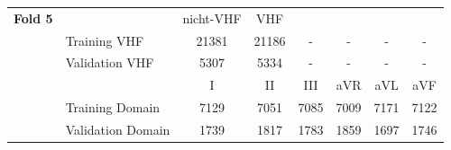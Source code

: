\begin{table}[h!]
\begin{tabular}{llcccccc}
\textbf{Fold 5} & & nicht-VHF & VHF & & & &\\
\cmidrule{2-8}
	   & Training VHF       & 21381 & 21186 & - & - & - & - \\
       & Validation VHF     & 5307 & 5334 & - & - & - & - \\
\cmidrule{3-8}
       & & I & II & III & aVR & aVL & aVF \\
\cmidrule{3-8}
       & Training Domain    & 7129 & 7051 & 7085 & 7009 & 7171 & 7122 \\
       & Validation Domain  & 1739 & 1817 & 1783 & 1859 & 1697 & 1746 \\

\bottomrule
\end{tabular}
\end{table}

